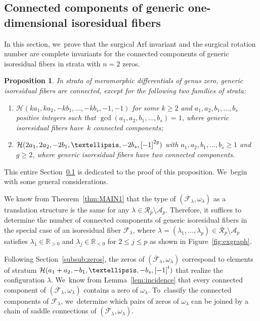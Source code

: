 \documentclass[11pt]{article}
\newcommand{\Subsection}{\subsection}
\newtheorem{prop}[thm]{Proposition}
\theoremstyle{definition}
\begin{document}
\Subsection{Connected components of generic one-dimensional isoresidual fibers}\label{sub:ConnectedUni}

In this section, we~prove that the surgical Arf invariant and the surgical rotation number are complete invariants for the connected components of generic isoresidual fibers in strata with $n=2$ zeros.

\begin{prop}\label{prop:MAIN5}
In strata of meromorphic differentials of genus zero, generic isoresidual fibers are connected, except for the following two families of strata:
\begin{enumerate}
\item $\mathcal{H}(ka_{1},ka_{2},-kb_{1},\dots,-kb_{s},-1,-1)$ for some $k \geq 2$ and $a_{1},a_{2},b_{1},\dots,b_{s}$ positive integers such that $\gcd(a_{1},a_{2},b_{1},\dots,b_{s})=1$, where generic isoresidual fibers have~$k$ connected components;
\item $\mathcal{H}(2a_{1},2a_{2},-2b_{1},\dots,-2b_{s},\rec[-1][2g])$ with $a_{1},a_{2},b_{1},\dots,b_{s}\geq 1$ and $g \geq 2$, where generic isoresidual fibers have two connected components.
\end{enumerate}
\end{prop}

This entire Section~\ref{sub:ConnectedUni} is dedicated to the proof of this proposition. We~begin with some general considerations.

We know from Theorem~\ref{thm:MAIN1} that the type of $(\overline{\mathcal{F}}_{\lambda}, \omega_\lambda)$ as a translation structure is the same for any $\lambda \in \mathcal{R}_{p} \setminus \mathcal{A}_{p}$. Therefore, it suffices to determine the number of connected components of generic isoresidual fibers in the special case of an isoresidual fiber $\mathcal{F}_{\lambda}$, where $\lambda=(\lambda_{1},\dots,\lambda_{p})\in \mathcal{R}_{p} \setminus \mathcal{A}_{p}$ satisfies $\lambda_{1} \in \mathbb{R}_{>0}$ and $\lambda_{j} \in \mathbb{R}_{<0}$ for $2 \leq j \leq p$ as shown in Figure~\ref{fig:exgraph}.

Following Section~\ref{subsub:zeros}, the zeros of $(\overline{\mathcal{F}}_{\lambda}, \omega_\lambda)$ correspond to elements of stratum $\mathcal{H}(a_{1}+a_{2},-b_{1},\dots,-b_{s},\rec[-1][t])$ that realize the configuration $\lambda$. We~know from Lemma~\ref{lem:incidence} that every connected component of $(\overline{\mathcal{F}}_{\lambda}, \omega_\lambda)$ contains a zero of $\omega_{\lambda}$. To~classify the connected components of $\mathcal{F}_{\lambda}$, we~determine which pairs of zeros of $\omega_{\lambda}$ can be joined by a chain of saddle connections of $(\overline{\mathcal{F}}_{\lambda}, \omega_\lambda)$.
\end{document}
